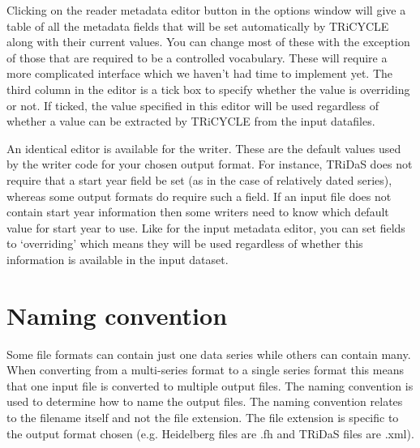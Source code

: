 \documentclass[10pt, headsepline,DIV14,BCOR0.5cm]{scrreprt}
\begin{document}
Clicking on the reader metadata editor button in the options window will give a table of all the metadata
fields that will be set automatically by TRiCYCLE along with their current values. You can change most
of these with the exception of those that are required to be a controlled vocabulary. These will require a 
more complicated interface which we haven't had time to implement yet. The third column in the editor is
a tick box to specify whether the value is overriding or not. If ticked, the value specified in this editor will
be used regardless of whether a value can be extracted by TRiCYCLE from the input datafiles.

An identical editor is available for the writer. These are the default values used by the writer code for
your chosen output format. For instance, TRiDaS does not require that a start year field be set (as in the
case of relatively dated series), whereas some output formats do require such a field. If an input file does
not contain start year information then some writers need to know which default value for start year to
use. Like for the input metadata editor, you can set fields to `overriding' which means they will be used
regardless of whether this information is available in the input dataset.

\section{Naming convention}

Some file formats can contain just one data series while others can contain many. When converting from
a multi-series format to a single series format this means that one input file is converted to multiple output
files. The naming convention is used to determine how to name the output files. The naming convention
relates to the filename itself and not the file extension. The file extension is specific to the output format
chosen (e.g. Heidelberg files are .fh and TRiDaS files are .xml).
\end{document}
